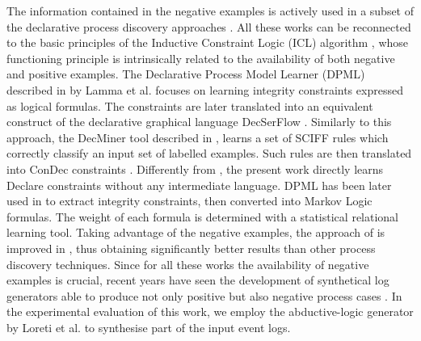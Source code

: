 The information contained in the negative examples is actively used in a subset of the declarative process discovery approaches \cite{2007-Lamma,2009-Chesani,2010-Bellodi,2016-Bellodi}. All these works can be reconnected to the basic principles of the Inductive Constraint Logic (ICL) algorithm \cite{1995-DaRaedt}, whose functioning principle is intrinsically related to the availability of both negative and positive examples. 
The Declarative Process Model Learner (DPML) described in \cite{2007-Lamma, 2007b-Lamma} by Lamma et al. focuses on learning integrity constraints expressed as logical formulas. The constraints are later translated into an equivalent construct of the declarative graphical language DecSerFlow \cite{2006-Aalst}. Similarly to this approach, the DecMiner tool described in \cite{2009-Chesani}, learns a set of SCIFF rules \cite{2008-Alberti} which correctly classify an input set of labelled examples. Such rules are then translated into ConDec constraints \cite{2006-Pesic}. Differently from \cite{2009-Chesani}, the present work directly learns Declare constraints without any intermediate language.
DPML has been later used in \cite{2010-Bellodi} to extract integrity constraints, then converted into Markov Logic formulas. The weight of each formula is determined with a statistical relational learning tool. %
Taking advantage of the negative examples, the approach of \cite{2010-Bellodi}  is improved in \cite{2016-Bellodi}, thus obtaining significantly better results than other process discovery techniques. 
Since for all these works the availability of negative examples is crucial, recent years have seen the development of synthetical log generators able to produce not only positive but also negative process cases \cite{2019-Chesani,2017-Chesani,2020-Loreti,2009-Goedertier, 2014-Stocker, 2010-Hee}. In the experimental evaluation of this work, we employ the abductive-logic generator by Loreti et al. \cite{2020-Loreti} to synthesise part of the input event logs.
 
